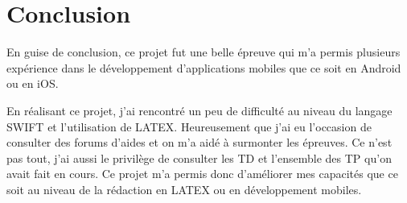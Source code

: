\documentclass{rapportECL}
\begin{document}
\newpage
\section{Conclusion}

En guise de conclusion, ce projet fut une belle épreuve qui m'a permis plusieurs expérience dans le développement d'applications mobiles que ce soit en Android ou en iOS.

En réalisant ce projet, j'ai rencontré un peu de difficulté au niveau du langage SWIFT\cite{iOS} et l'utilisation de LATEX\cite{Overleaf}. Heureusement que j'ai eu l'occasion de consulter des forums d'aides et on m'a aidé à surmonter les épreuves. Ce n'est pas tout, j'ai aussi le privilège de consulter les TD et l'ensemble des TP qu'on avait fait en cours. Ce projet m'a permis donc d'améliorer mes capacités que ce soit au niveau de la rédaction en LATEX\cite{Overleaf} ou en développement mobiles.
\newpage



\end{document}
